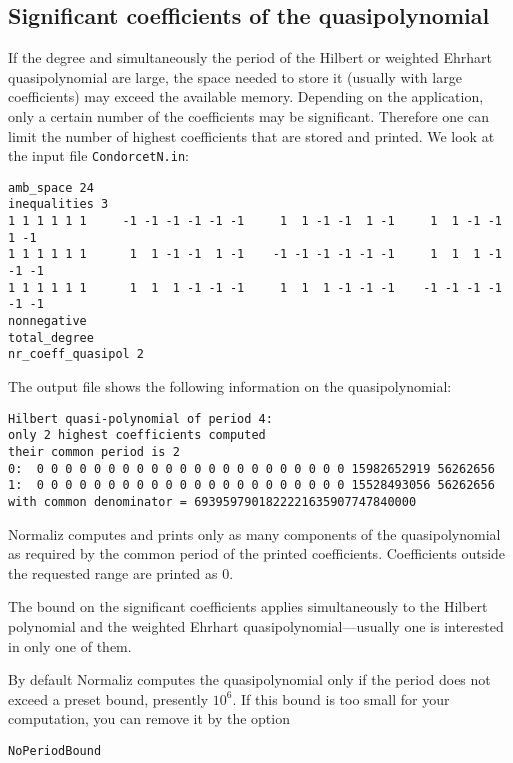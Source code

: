 \documentclass[12pt,a4paper]{scrartcl}
\theoremstyle{definition}
\begin{document}
\subsection{Significant coefficients of the quasipolynomial}\label{highest_coeff}

If the degree and simultaneously the period of the Hilbert or weighted Ehrhart quasipolynomial are large, the space needed to store it (usually with large coefficients) may exceed the available memory. Depending on the application, only a certain number of the coefficients may be significant. Therefore one can limit the number of highest coefficients that are stored and printed. We look at the input file \texttt{CondorcetN.in}:
\begin{Verbatim}
amb_space 24
inequalities 3
1 1 1 1 1 1     -1 -1 -1 -1 -1 -1     1  1 -1 -1  1 -1     1  1 -1 -1  1 -1
1 1 1 1 1 1      1  1 -1 -1  1 -1    -1 -1 -1 -1 -1 -1     1  1  1 -1 -1 -1
1 1 1 1 1 1      1  1  1 -1 -1 -1     1  1  1 -1 -1 -1    -1 -1 -1 -1 -1 -1
nonnegative
total_degree
nr_coeff_quasipol 2
\end{Verbatim}

The output file shows the following information on the quasipolynomial:
\begin{Verbatim}
Hilbert quasi-polynomial of period 4:
only 2 highest coefficients computed
their common period is 2
0:  0 0 0 0 0 0 0 0 0 0 0 0 0 0 0 0 0 0 0 0 0 0 15982652919 56262656
1:  0 0 0 0 0 0 0 0 0 0 0 0 0 0 0 0 0 0 0 0 0 0 15528493056 56262656
with common denominator = 6939597901822221635907747840000
\end{Verbatim}
Normaliz computes and prints only as many components of the quasipolynomial as required by the common period of the printed coefficients. Coefficients outside the requested range are printed as $0$.

The bound on the significant coefficients applies simultaneously to the Hilbert polynomial and the weighted Ehrhart quasipolynomial---usually one is interested in only one of them.

By default Normaliz computes the quasipolynomial only if the period does not exceed a preset bound, presently $10^6$. If this bound is too small for your computation, you can remove it by the option
\begin{Verbatim}
NoPeriodBound
\end{Verbatim}
\end{document}
